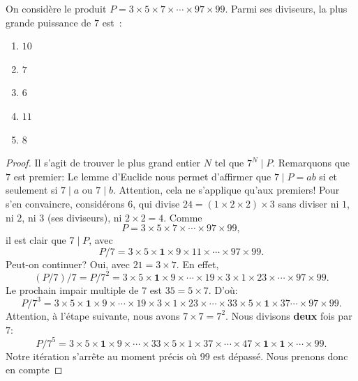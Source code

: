 \label{1.5}
On considère le produit $P = 3 \times 5 \times 7 \times \cdots \times 97 \times 99$.
Parmi ses diviseurs, la plus grande puissance de $7$ est~:
\begin{enumerate}
  \item $10$
  \item $7$
  \item $6$
  \item $11$
  \item $8$
\end{enumerate}
%
%
\begin{proof}
Il s'agit de trouver le plus grand entier $N$ tel que $7^N \mid P$. 
Remarquons que $7$ est premier: Le lemme d'Euclide nous permet d'affirmer que $7 \mid P = a b$  si et seulement si %
$7 \mid a$ ou $ 7 \mid b$. Attention, cela ne s'applique qu'aux premiers! Pour s'en convaincre, considérons $6$, qui divise %
$24 = (1 \times 2 \times 2) \times 3$ sans diviser ni $1$, ni $2$, ni $3$ (ses diviseurs), ni $2 \times 2 = 4$. 
%
Comme
%
\begin{equation}
P = 3 \times 5 \times 7 \times \cdots \times 97 \times 99, 
\end{equation}
%
il est clair que $7 \mid P$, avec 
%
\begin{equation}
P / 7 = 3 \times 5 \times \mathbf{1} \times 9 \times 11 \times \cdots \times 97 \times 99. 
\end{equation}
%
Peut-on continuer?  Oui, avec $21 = 3 \times 7$. En effet, 
%
\begin{equation}
(P / 7) / 7 = P / 7^2 = 3 \times 5 \times \mathbf{1} \times 9 \times \cdots \times 19 \times 3 \times %
1 \times 23 \times \cdots \times 97 \times 99.
\end{equation}
%
Le prochain impair multiple de $7$ est $35 = 5 \times 7$. D'où:
%
\begin{equation}
P/7^{3} = 3 \times 5 \times \mathbf{1}\times 9 \times \cdots \times 19 \times 3 \times %
1 \times 23 \times \cdots \times 33 \times 5 \times \mathbf{1}\times 37\cdots \times 97 \times 99.
\end{equation}
%
Attention, à l'étape suivante, nous avons $7 \times 7=7^{2}$. Nous divisons \textbf{deux} fois par $7$: 
%
\begin{equation}
P/7^{5}=3 \times 5 \times \mathbf{1}\times 9 \times \cdots \times 33 \times 5 \times %
1 \times 37 \times \cdots \times 47 \times \mathbf{1}\times \mathbf{1}\times \cdots \times 99.
\end{equation}
%
Notre itération s'arrête au moment précis où $99$ est dépassé. Nous prenons donc en compte 

\end{proof}
